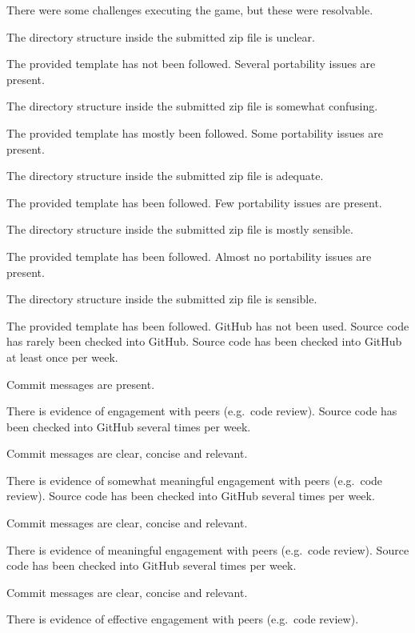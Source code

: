 \documentclass{../fal_assignment}
\begin{document}
\begin{markingrubric}
        \grade There were some challenges executing the game, but these were resolvable.
            \par The directory structure inside the submitted zip file is unclear.
            \par The provided template has not been followed.
        \grade Several portability issues are present.
            \par The directory structure inside the submitted zip file is somewhat confusing.
            \par The provided template has mostly been followed.
        \grade Some portability issues are present.
            \par The directory structure inside the submitted zip file is adequate.
            \par The provided template has been followed.
        \grade Few portability issues are present.
            \par The directory structure inside the submitted zip file is mostly sensible.
            \par The provided template has been followed.
        \grade Almost no portability issues are present.
            \par The directory structure inside the submitted zip file is sensible.
            \par The provided template has been followed.
%
        \grade\fail GitHub has not been used.
        \grade Source code has rarely been checked into GitHub.
        \grade Source code  has been checked into GitHub at least once per week.
            \par Commit messages are present.
            \par There is evidence of engagement with peers (e.g.\ code review).
        \grade Source code  has been checked into GitHub several times per week.
            \par Commit messages are clear, concise and relevant.
            \par There is evidence of somewhat meaningful engagement with peers (e.g.\ code review).
        \grade Source code has been checked into GitHub several times per week.
            \par Commit messages are clear, concise and relevant.
            \par There is evidence of meaningful engagement with peers (e.g.\ code review).
        \grade Source code has been checked into GitHub several times per week.
            \par Commit messages are clear, concise and relevant.
            \par There is evidence of effective engagement with peers (e.g.\ code review).
%
\end{markingrubric}
\end{document}
